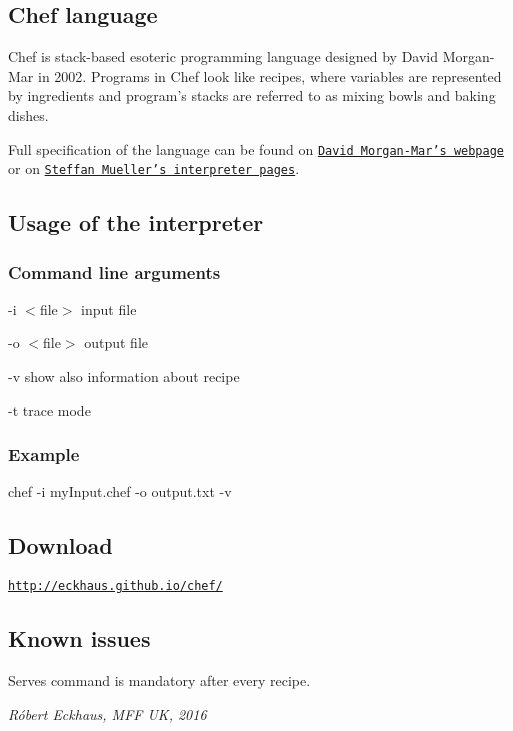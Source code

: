 \subsection*{Chef language}

Chef is stack-\/based esoteric programming language designed by David Morgan-\/\-Mar in 2002. Programs in Chef look like recipes, where variables are represented by ingredients and program's stacks are referred to as mixing bowls and baking dishes.

Full specification of the language can be found on \href{http://www.dangermouse.net/esoteric/chef.html}{\tt David Morgan-\/\-Mar's webpage} or on \href{http://search.cpan.org/~smueller/Acme-Chef/lib/Acme/Chef.pm}{\tt Steffan Mueller's interpreter pages}. \subsection*{Usage of the interpreter}

\subsubsection*{Command line arguments}

-\/i $<$file$>$ input file

-\/o $<$file$>$ output file

-\/v show also information about recipe

-\/t trace mode \subsubsection*{Example}

chef -\/i my\-Input.\-chef -\/o output.\-txt -\/v

\subsection*{Download}

\href{http://eckhaus.github.io/chef/}{\tt http\-://eckhaus.\-github.\-io/chef/}

\subsection*{Known issues}

Serves command is mandatory after every recipe.

{\itshape Róbert Eckhaus, M\-F\-F U\-K, 2016} 